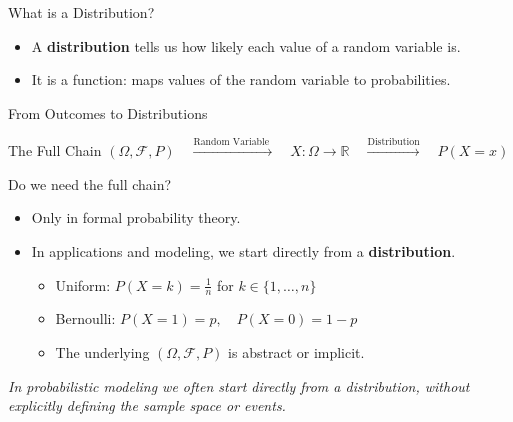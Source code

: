 \documentclass{beamer}
\begin{document}
\begin{frame}{What is a Distribution?}
\begin{itemize}
  \item A \textbf{distribution} tells us how likely each value of a random variable is.
  \item It is a function: maps values of the random variable to probabilities.
\end{itemize}

\vspace{0.3cm}
\begin{center}
\end{center}
\end{frame}

\begin{frame}{From Outcomes to Distributions}

\begin{block}{The Full Chain}
\(
(\Omega, \mathcal{F}, P)
\quad \xrightarrow{\text{Random Variable }} \quad
X: \Omega \rightarrow \mathbb{R}
\quad \xrightarrow{\text{Distribution}} \quad
P(X = x)
\)
\end{block}

\vspace{0.5cm}

\begin{block}{Do we need the full chain?}
\begin{itemize}
  \item Only in formal probability theory.
  \item In applications and modeling, we start directly from a \textbf{distribution}.
    \begin{itemize}
    \item Uniform: $P(X = k) = \frac{1}{n}$ for $k \in \{1, \dots, n\}$
    \item Bernoulli: $P(X = 1) = p,\quad P(X = 0) = 1-p$
    \item The underlying $(\Omega, \mathcal{F}, P)$ is abstract or implicit.
    \end{itemize}
\end{itemize}
\end{block}


\vspace{0.3cm}
\begin{center}
  \textit{In probabilistic modeling we often start directly from a distribution, without explicitly defining the sample space or events.}
\end{center}

\end{frame}
\end{document}
